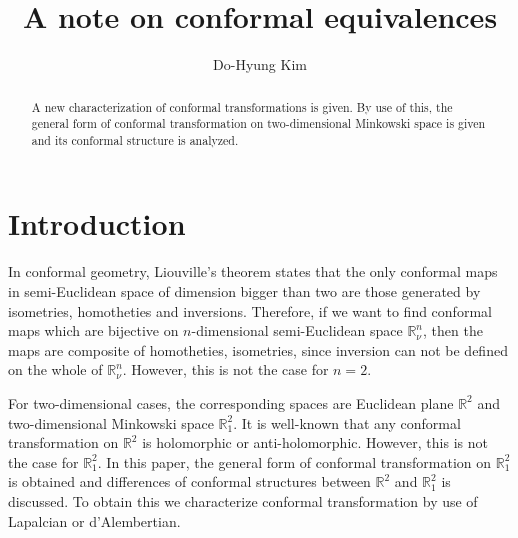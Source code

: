\documentclass[a4paper,10pt]{amsart}
\theoremstyle{plain}
\newtheorem*{main theorem}{Theorem}
\theoremstyle{definition}
\begin{document}
\title{A note on conformal equivalences}
\author{Do-Hyung Kim}
\address{Department of Mathematics, College of Natural Science, Dankook University,
San 29, Anseo-dong, Dongnam-gu, Cheonan-si, Chungnam, 330-714,
Republic of Korea} 



\begin{abstract}
A new characterization of conformal transformations is given. By
use of this, the general form of conformal transformation on
two-dimensional Minkowski space is given and its conformal
structure is analyzed.
\end{abstract}

\maketitle

\section{Introduction} \label{section:1}

In conformal geometry, Liouville's theorem states that the only
conformal maps in semi-Euclidean space of dimension bigger than
two are those generated by isometries, homotheties and inversions.
Therefore, if we want to find conformal maps which are bijective
on $n$-dimensional semi-Euclidean space $\mathbb{R}^n_\nu$, then
the maps are composite of homotheties, isometries, since inversion
can not be defined on the whole of $\mathbb{R}^n_\nu$. However,
this is not the case for $n=2$.

For two-dimensional cases, the corresponding spaces are Euclidean
plane $\mathbb{R}^2$ and two-dimensional Minkowski space
$\mathbb{R}^2_1$. It is well-known that any conformal
transformation on $\mathbb{R}^2$ is holomorphic or
anti-holomorphic. However, this is not the case for
$\mathbb{R}^2_1$. In this paper, the general form of conformal
transformation on $\mathbb{R}^2_1$ is obtained and differences of
conformal structures between $\mathbb{R}^2$ and $\mathbb{R}^2_1$
is discussed. To obtain this we characterize conformal
transformation by use of Lapalcian or d'Alembertian.
\end{document}
